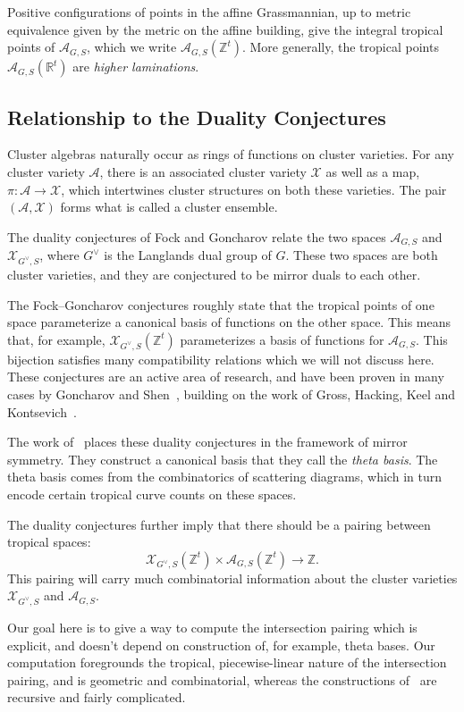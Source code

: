 \documentclass[ALCO,ThmDefs,Unicode,epreuves]{cedram}
\newcommand{\Z}{\mathbb{Z}}
\newcommand{\Zt}{\mathbb{Z}^t}
\newcommand{\Rt}{\mathbb{R}^t}
\newcommand{\A}{\mathcal{A}}
\newcommand{\X}{\mathcal{X}}
\newcommand{\vG}{G^\vee}
\begin{document}
Positive configurations of points in the affine Grassmannian, up to metric equivalence given by the metric on the affine building, give the integral tropical points of $\A_{G,S}$, which we write $\A_{G,S}(\Zt)$. More generally, the tropical points $\A_{G,S}(\Rt)$ are \emph{higher laminations}.

\subsection{Relationship to the Duality Conjectures}

Cluster algebras naturally occur as rings of functions on cluster varieties. For any cluster variety $\A$, there is an associated cluster variety $\X$ as well as a map, $\pi: \A \rightarrow \X$, which intertwines cluster structures on both these varieties. The pair $(\A,\X)$ forms what is called a cluster ensemble.

The duality conjectures of Fock and Goncharov relate the two spaces $\A_{G,S}$ and $\X_{\vG,S}$, where $\vG$ is the Langlands dual group of $G$. These two spaces are both cluster varieties, and they are conjectured to be mirror duals to each other.

The Fock--Goncharov conjectures roughly state that the tropical points of one space parameterize a canonical basis of functions on the other space. This means that, for example, $\X_{\vG,S}(\Zt)$ parameterizes a basis of functions for $\A_{G,S}$. This bijection satisfies many compatibility relations which we will not discuss here. These conjectures are an active area of research, and have been proven in many cases by Goncharov and Shen~\cite{GS2}, building on the work of Gross, Hacking, Keel and Kontsevich~\cite{GHKK}.

The work of~\cite{GHKK} places these duality conjectures in the framework of mirror symmetry. They construct a canonical basis that they call the \emph{theta basis}. The theta basis comes from the combinatorics of scattering diagrams, which in turn encode certain tropical curve counts on these spaces.

The duality conjectures further imply that there should be a pairing between tropical spaces:
\[
\X_{\vG,S}(\Zt) \times \A_{G,S}(\Zt) \rightarrow \Z.
\]
This pairing will carry much combinatorial information about the cluster varieties $\X_{\vG,S}$ and $\A_{G,S}$.

Our goal here is to give a way to compute the intersection pairing which is explicit, and doesn't depend on construction of, for example, theta bases. Our computation foregrounds the tropical, piecewise-linear nature of the intersection pairing, and is geometric and combinatorial, whereas the constructions of~\cite{GHKK} are recursive and fairly complicated.
\end{document}
